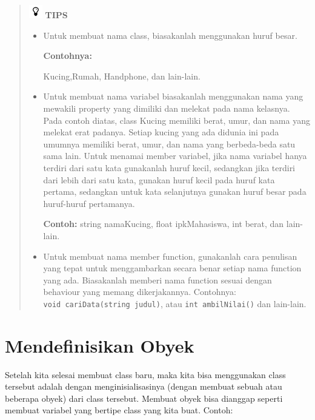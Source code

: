 \begin{quotation}
\includegraphics{../manuscript/images/tips}		\textbf{TIPS}

\begin{itemize}
\item Untuk membuat
nama class, biasakanlah menggunakan huruf besar.
				
\textbf{ Contohnya:}
				
 Kucing,Rumah, Handphone, dan lain-lain.
				
\item Untuk membuat nama
variabel biasakanlah menggunakan nama yang mewakili property yang
dimiliki dan melekat pada nama kelasnya. Pada contoh diatas, class
Kucing memiliki berat, umur, dan nama yang melekat erat padanya. Setiap
kucing yang ada didunia ini pada umumnya memiliki berat, umur, dan nama
yang berbeda-beda satu sama lain. Untuk menamai member variabel, jika
nama variabel hanya terdiri dari satu kata gunakanlah huruf kecil,
sedangkan jika terdiri dari lebih dari satu kata, gunakan huruf kecil
pada huruf kata pertama, sedangkan untuk kata selanjutnya gunakan huruf
besar pada huruf-huruf pertamanya.
				
 \textbf{Contoh: }string namaKucing, float
ipkMahasiswa, int berat, dan lain-lain.
				
\item Untuk membuat
nama member function, gunakanlah cara penulisan yang tepat untuk
menggambarkan secara benar setiap nama function yang ada. Biasakanlah
memberi nama function sesuai dengan behaviour yang memang dikerjakannya.
Contohnya: \texttt{void\ cariData(string\ judul)}, atau
				\texttt{int\ ambilNilai()} dan lain-lain.
			\end{itemize}
			
	\end{quotation}


\section{Mendefinisikan Obyek}\label{mendefinisikan-obyek}

Setelah kita selesai membuat class baru, maka kita bisa menggunakan
class tersebut adalah dengan menginisialisasinya (dengan membuat sebuah
atau beberapa obyek) dari class tersebut. Membuat obyek bisa dianggap
seperti membuat variabel yang bertipe class yang kita buat. Contoh:

